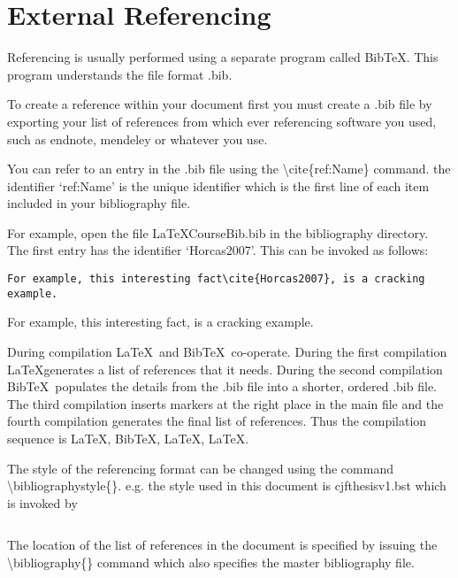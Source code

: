 \chapter{External Referencing}

Referencing is usually performed using a separate program called Bib\TeX.  This program understands the file format .bib.

To create a reference within your document first you must create a .bib file by exporting your list of references from which ever referencing software you used, such as endnote, mendeley or whatever you use.

You can refer to an entry in the .bib file using the {\textbackslash}cite\{ref:Name\} command. the identifier `ref:Name' is the unique identifier which is the first line of each item included in your bibliography file.

For example, open the file LaTeXCourseBib.bib in the bibliography directory. The first entry has the identifier `Horcas2007'.  This can be invoked as follows:


\begin{verbatim}
For example, this interesting fact\cite{Horcas2007}, is a cracking example.
\end{verbatim}

For example, this interesting fact\cite{Horcas2007}, is a cracking example.

During compilation \LaTeX\ and BibTeX\ co-operate. During the first compilation \LaTeX generates a list of references that it needs.  During the second compilation Bib\TeX\ populates the details from the .bib file into a shorter, ordered .bib file. The third compilation inserts markers at the right place in the main file and the fourth compilation generates the final list of references. Thus the compilation sequence is \LaTeX, Bib\TeX, \LaTeX, \LaTeX.

The style of the referencing format can be changed using the command \textbackslash bibliographystyle\{\}. e.g. the style used in this document is cjfthesisv1.bst which is invoked by

\begin{verbatim}

\end{verbatim}

The location of the list of references in the document is specified by issuing the \textbackslash bibliography\{\} command which also specifies the master bibliography file.

\begin{verbatim}

\end{verbatim}



